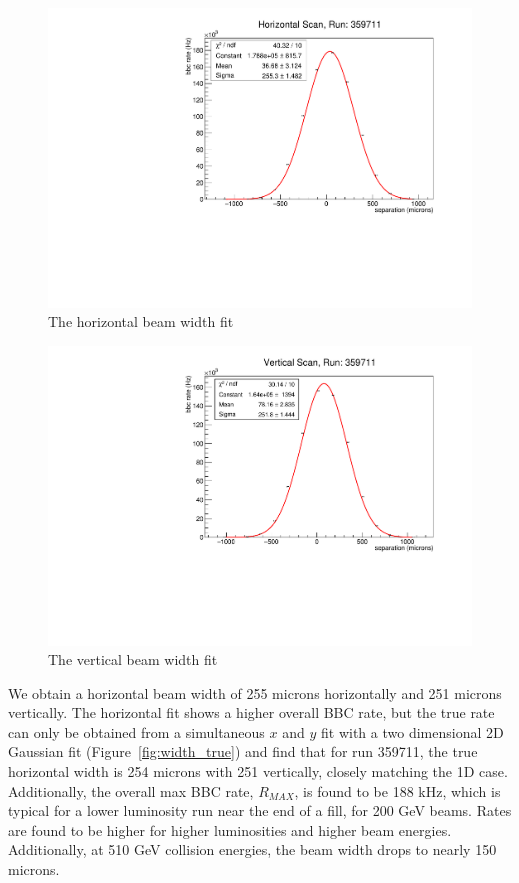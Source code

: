 \begin{figure}[ht]
  \centering
  \includegraphics[width=0.7\linewidth]{./figures/h_width_359711.pdf}
  \caption{
    The horizontal beam width fit
  }
  \label{fig:beam_width_h_359711}
\end{figure}
\begin{figure}[ht]
  \centering
  \includegraphics[width=0.7\linewidth]{./figures/v_width_359711.pdf}
  \caption{
    The vertical beam width fit
  }
  \label{fig:beam_width_v_359711}
\end{figure}
\clearpage

We obtain a horizontal beam width of 255 microns horizontally and 251 microns
vertically. The horizontal fit shows a higher overall BBC rate, but the true
rate can only be obtained from a simultaneous $x$ and $y$ fit with a two
dimensional 2D Gaussian fit (Figure~\ref{fig:width_true}) and find that for run
359711, the true horizontal width is 254 microns with 251 vertically, closely
matching the 1D case. Additionally, the overall max BBC rate, $R_{MAX}$, is
found to be 188 kHz, which is typical for a lower luminosity run near the end of
a fill, for 200 GeV beams. Rates are found to be higher for higher luminosities
and higher beam energies. Additionally, at 510 GeV collision energies, the beam
width drops to nearly 150 microns.

